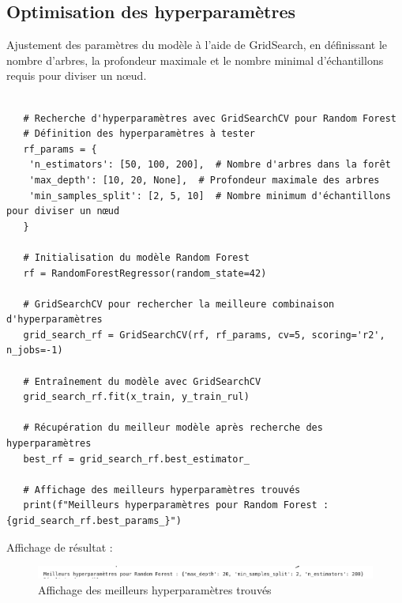 \subsection{Optimisation des hyperparamètres}
Ajustement des paramètres du modèle à l'aide de GridSearch, en définissant le nombre d'arbres, la profondeur maximale et le nombre minimal d'échantillons requis pour diviser un nœud.
\begin{verbatim}

   # Recherche d'hyperparamètres avec GridSearchCV pour Random Forest
   # Définition des hyperparamètres à tester
   rf_params = {
   	'n_estimators': [50, 100, 200],  # Nombre d'arbres dans la forêt
   	'max_depth': [10, 20, None],  # Profondeur maximale des arbres
   	'min_samples_split': [2, 5, 10]  # Nombre minimum d'échantillons pour diviser un nœud
   }
   
   # Initialisation du modèle Random Forest
   rf = RandomForestRegressor(random_state=42)
   
   # GridSearchCV pour rechercher la meilleure combinaison d'hyperparamètres
   grid_search_rf = GridSearchCV(rf, rf_params, cv=5, scoring='r2', n_jobs=-1)
   
   # Entraînement du modèle avec GridSearchCV
   grid_search_rf.fit(x_train, y_train_rul)
   
   # Récupération du meilleur modèle après recherche des hyperparamètres
   best_rf = grid_search_rf.best_estimator_
   
   # Affichage des meilleurs hyperparamètres trouvés
   print(f"Meilleurs hyperparamètres pour Random Forest : {grid_search_rf.best_params_}")
\end{verbatim}
Affichage de résultat : 
\begin{figure}[H]
	\centering
	\includegraphics[width=16cm]{./img/resultats/goodParam.png}
	\caption{ Affichage des meilleurs hyperparamètres trouvés}
	
\end{figure}


